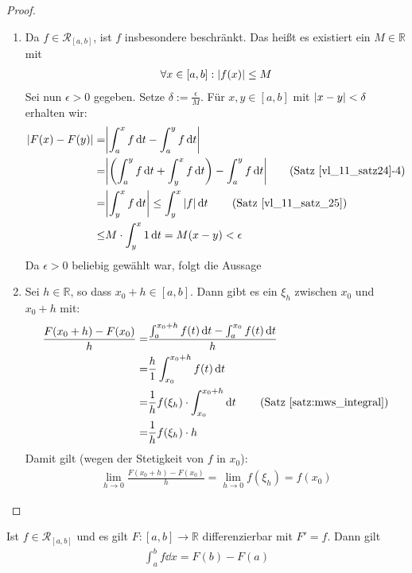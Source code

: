 \begin{proof}~
	\begin{enumerate}
		\item Da $f \in \mathcal{R}_{[a,b]}$, ist $f$ insbesondere beschränkt.
		Das heißt es existiert ein $M \in \mathbb{R}$ mit 
		\begin{align*}
			\forall x \in [a,b]:\abs{f(x)} \leq M
		\end{align*}
		Sei nun $\epsilon > 0$ gegeben. Setze $\delta := \frac{\epsilon}{M}$. 
		Für $x, y \in [a,b]$ mit $\abs{x-y} < \delta$ erhalten wir:
		\begin{align*}
			\abs{F(x) - F(y)} = & \abs{\int_a^x f \dd{t} - \int_a^y f \dd{t} }\\
			= &  \abs{ \left (\int_a^y f\dd{t} + \int_y^x f\dd{t} \right ) - \int_a^yf\dd{t}} \tag{Satz~\ref{vl_11_satz24}-4}\\
			= & \abs{\int_y^x f\dd{t}} \leq \int_y^x \abs{f} \dd{t} \tag{Satz~\ref{vl_11_satz_25}}\\
			\leq & M \cdot \int_y^x 1 \dd{t} = M (x-y) < \epsilon
		\end{align*}
		Da $\epsilon > 0$ beliebig gewählt war, folgt die Aussage
		\item Sei $h \in \mathbb{R}$, so dass $x_0 +h \in [a,b]$.
		Dann gibt es ein $\xi_h$ zwischen $x_0$ und $x_0+h$ mit:
		\begin{align*}
			\frac{F(x_0 + h) - F(x_0)}{h}
			= & \frac{ \int_a^{x_0+h}f(t)\dd{t}- \int_a^{x_0}f(t)\dd{t}}{h} \\
			= & \frac{h}{1} \int_{x_0}^{x_0+h} f(t)\dd{t} \\
			= & \frac{1}{h} f(\xi_h) \cdot \int_{x_0}^{x_0+h} \dd{t} \tag{Satz~\ref{satz:mws_integral}}\\
			= & \frac{1}{h} f(\xi_h) \cdot h
		\end{align*}
		 Damit gilt (wegen der Stetigkeit von $f$ in $x_0$):
		 \begin{align*}
		 \lim\limits_{h \rightarrow 0}{\frac{F(x_0+h)-F(x_0)}{h}} 
			= \lim\limits_{h \rightarrow 0} f(\xi_h) = f(x_0)
		 \end{align*}
	\end{enumerate}
\end{proof}


\begin{Satz}{\label{vl_12_satz_02}
	Ist $f \in \mathcal{R}_{[a,b]}$ und es gilt $F: [a,b] \rightarrow \mathbb{R}$
	differenzierbar mit $F' = f$. Dann gilt
	\begin{align*}
		\int_a^b f\dd{x} = F(b) - F(a) 
	\end{align*}
}\end{Satz}

